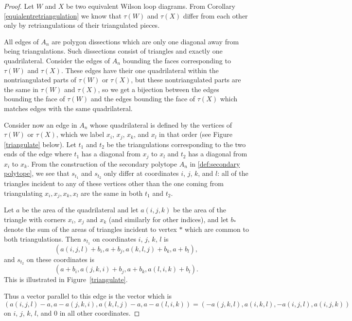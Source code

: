 \documentclass[11pt]{article}
\theoremstyle{remark}
\theoremstyle{definition}
\begin{document}
\begin{proof}
  Let $W$ and $X$ be two equivalent Wilson loop diagrams.  From Corollary \ref{equialentretriangulation} we know that $\tau(W)$ and $\tau(X)$ differ from each other only by retriangulations of their triangulated pieces. 

All edges of $A_n$ are polygon dissections which are only one diagonal away from being triangulations.  Such dissections consist of triangles and exactly one quadrilateral.  Consider the edges of $A_n$ bounding the faces corresponding to $\tau(W)$ and $\tau(X)$.  These edges have their one quadrilateral within the nontriangulated parts of $\tau(W)$ or $\tau(X)$, but these nontriangulated parts are the same in $\tau(W)$ and $\tau(X)$, so we get a bijection between the edges bounding the face of $\tau(W)$ and the edges bounding the face of $\tau(X)$ which matches edges with the same quadrilateral.

Consider now an edge in $A_n$ whose quadrilateral is defined by the vertices of $\tau(W)$ or $\tau(X)$, which we label $x_i$, $x_j$, $x_k$, and $x_l$ in that order (see Figure \ref{triangulate} below).  Let $t_1$ and $t_2$ be the triangulations corresponding to the two ends of the edge where $t_1$ has a diagonal from $x_j$ to $x_l$ and $t_2$ has a diagonal from $x_i$ to $x_k$.  From the construction of the secondary polytope $A_n$ in \ref{def:secondary polytope}, we see that $s_{t_1}$ and $s_{t_2}$ only differ at coordinates $i$, $j$, $k$, and $l$: all of the triangles incident to any of these vertices other than the one coming from triangulating $x_i, x_j, x_k, x_l$ are the same in both $t_1$ and $t_2$.  

Let $a$ be the area of the quadrilateral and let $a(i,j,k)$ be the area of the triangle with corners $x_i$, $x_j$ and $x_k$ (and similarly for other indices), and let $b_*$ denote the sum of the areas of triangles incident to vertex $*$ which are common to both triangulations. Then $s_{t_1}$ on coordinates $i$, $j$, $k$, $l$ is 
\[(a(i,j,l) + b_i, a+b_j, a(k,l,j)+b_k, a+b_l),\]
and $s_{t_2}$ on these coordinates is 
\[(a + b_i, a(j,k,i)+b_j, a+b_k, a(l,i,k)+b_l).\] 
This is illustrated in Figure~\ref{triangulate}.

Thus a vector parallel to this edge is the vector which is 
\begin{equation}\label{eq:direction vector for quadrilateral}(a(i,j,l) - a, a-a(j,k,i), a(k,l,j)-a, a-a(l,i,k)) = (-a(j,k,l), a(i,k,l), -a(i,j,l), a(i,j,k))\end{equation}
on $i$, $j$, $k$, $l$, and $0$ in all other coordinates. 


\end{proof}
\end{document}
